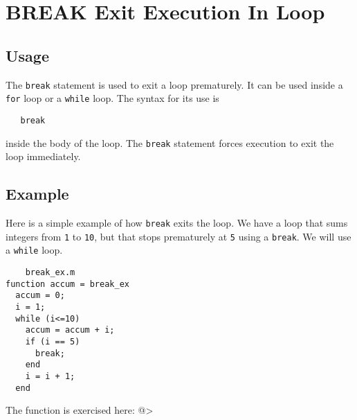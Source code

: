 \section{BREAK Exit Execution In Loop}

\subsection{Usage}

The \verb|break| statement is used to exit a loop prematurely.
It can be used inside a \verb|for| loop or a \verb|while| loop.  The
syntax for its use is
\begin{verbatim}
   break
\end{verbatim}
inside the body of the loop.  The \verb|break| statement forces
execution to exit the loop immediately.
\subsection{Example}

Here is a simple example of how \verb|break| exits the loop.
We have a loop that sums integers from \verb|1| to \verb|10|, but
that stops prematurely at \verb|5| using a \verb|break|.  We will
use a \verb|while| loop.
\begin{verbatim}
    break_ex.m
function accum = break_ex
  accum = 0;
  i = 1;
  while (i<=10) 
    accum = accum + i;
    if (i == 5)
      break;
    end
    i = i + 1;
  end
\end{verbatim}
The function is exercised here:
@>

